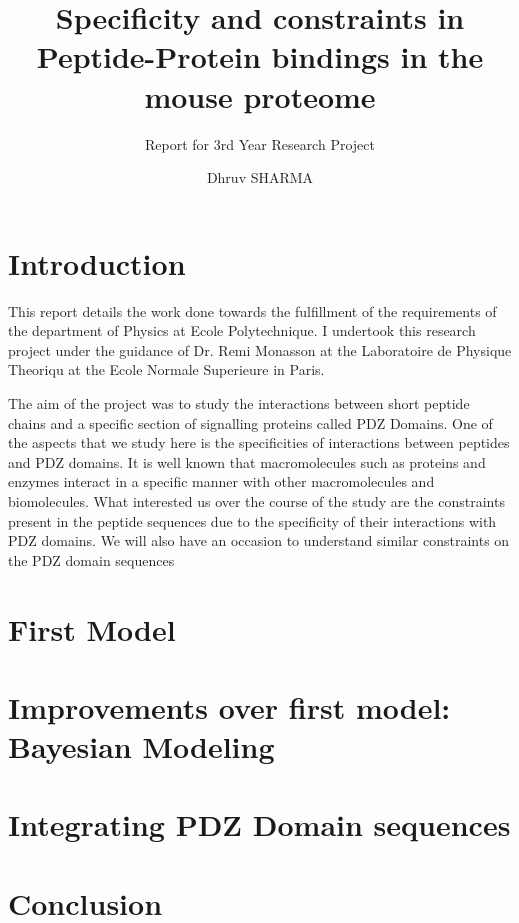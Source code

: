 \documentclass[a4paper, 12pt]{article}
\title{Specificity and constraints in Peptide-Protein bindings in the mouse proteome}
\subtitle{Report for 3rd Year Research Project}
\author{Dhruv SHARMA}
\begin{document}
\pagebreak
\maketitle
\tableofcontents
\pagebreak
\part{Introduction}
	This report details the work done towards the fulfillment of the requirements of the department of Physics at Ecole Polytechnique. I undertook this research project under the guidance of Dr. Remi Monasson at the Laboratoire de Physique Theoriqu at the Ecole Normale Superieure in Paris. 

	The aim of the project was to study the interactions between short peptide chains and a specific section of signalling proteins called PDZ Domains. One of the aspects that we study here is the specificities of interactions between peptides and PDZ domains. It is well known that macromolecules such as proteins and enzymes interact in a specific manner with other macromolecules and biomolecules. What interested us over the course of the study are the constraints present in the peptide sequences due to the specificity of their interactions with PDZ domains. We will also have an occasion to understand similar constraints on the PDZ domain sequences 

\part{First Model}
\part{Improvements over first model: Bayesian Modeling}
\part{Integrating PDZ Domain sequences} 
\part{Conclusion}
\end{document}
